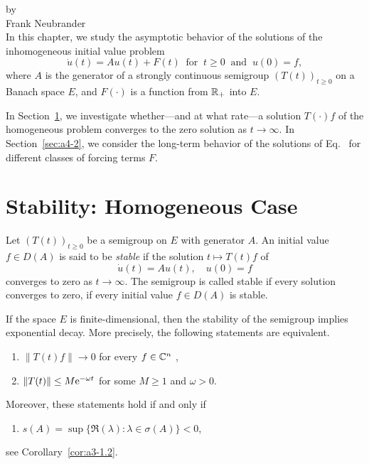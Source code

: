 \setcounter{section}{0}
\label{chap:a4}%
\thispagestyle{empty}
{\Large
\vspace*{-.75cm}
by \\[.25em]
Frank Neubrander
\vspace{.75cm}
\\
}
In this chapter, we study the asymptotic behavior of the solutions of the inhomogeneous initial value problem
\begin{equation}\label{eq:a4-1}
\dot{u}(t) = Au(t) + F(t) \ \text{ for } \  t \geq 0 \ \text{ and } \  
 u(0) = f, \tag{*}
\end{equation}
where $ A $ is the generator of a strongly continuous semigroup $ (T(t))_{t \geq 0} $ on a Banach space $ E $, and $ F(\cdot) $ is a function from $ \mathbb{R}_{+} $ into $ E $.

In Section~\ref{sec:a4-1}, we investigate whether---and at what rate---a solution $ T(\cdot)f $ of the homogeneous problem converges to the zero solution as $ t \to \infty $. 
In Section~\ref{sec:a4-2}, we consider the long-term behavior of the solutions of Eq.~\myeqpageref{eq:a4-1} for different classes of forcing terms $ F $.
\section{Stability: Homogeneous Case}\label{sec:a4-1}
Let $ (T(t))_{t \geq 0} $ be a semigroup on $ E $ with generator $ A $.
An initial value $ f \in D(A) $ is said to be \emph{stable} if the solution $ t \mapsto T(t)f $ of
\index{stability!stable}
\begin{equation}\label{eq:c4-2}
\dot{u}(t) = Au(t), \quad u(0) = f \tag{ACP}
\end{equation}
converges to zero as $ t \to \infty $. 
The semigroup is called stable if every solution converges to zero, \ie if every initial value $ f \in D(A) $ is stable.

If the space $ E $ is finite-dimensional, then the stability of the semigroup implies exponential decay. 
More precisely, the following statements are equivalent.
\begin{enumerate}[\upshape (a)]
\item 
$ \|T(t)f\| \to 0 $ for every $ f \in \mathbb{C}^{n} $ ,

\item 
$ \|T(t)\| \leq M \eu^{-\omega t} $ for some $M \geq 1$ and  $\omega > 0 $. 
\end{enumerate}
Moreover, these statements hold if and only if
\begin{enumerate}
\item 
$s(A) = \sup\{\Re(\lambda) \colon \lambda \in \sigma(A)\} < 0$, 
\end{enumerate}
see Corollary~\ref{cor:a3-1.2}.

